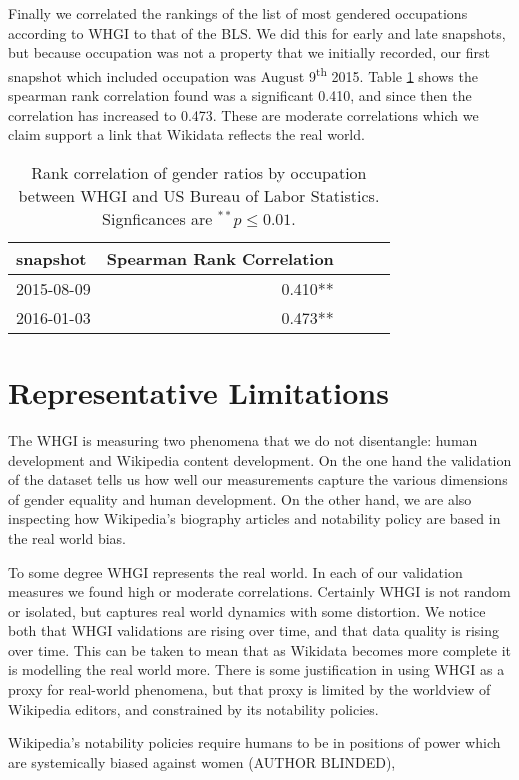 \documentclass{sig-alternate-05-2015}
\begin{document}
Finally we correlated the rankings of the list of most gendered occupations according to WHGI to that of the BLS. We did this for early and late snapshots, but because occupation was not a property that we initially recorded, our first snapshot which included occupation was August 9\textsuperscript{th} 2015. Table \ref{table:bls} shows the spearman rank correlation found was a significant 0.410, and since then the correlation has increased to 0.473. These are moderate correlations which we claim support a link that Wikidata reflects the real world.

\begin{table}
\caption{Rank correlation of gender ratios by occupation between WHGI and US
Bureau of Labor Statistics. Signficances are $ ^{**}p\leq 0.01$.}
\begin{tabular}{lrrrr}
\toprule
snapshot &  Spearman Rank Correlation \\
\midrule
2015-08-09 & 0.410**  \\
2016-01-03 & 0.473**  \\
\bottomrule
\end{tabular}
\label{table:bls}
\end{table}

\section{Representative Limitations}

The WHGI is measuring two phenomena that we do not disentangle: human development and Wikipedia content development. On the one hand the validation of the dataset tells us how well our measurements capture the various dimensions of gender equality and human development. On the other hand, we are also inspecting how Wikipedia's biography articles and notability policy are based in the real world bias.

To some degree WHGI represents the real world. In each of our validation measures we found high or moderate correlations. Certainly WHGI is not random or isolated, but captures real world dynamics with some distortion. We notice both that WHGI validations are rising over time, and that data quality is rising over time. This can be taken to mean that as Wikidata becomes more complete it is modelling the real world more. There is some justification in using WHGI as a proxy for real-world phenomena, but that proxy is limited by the worldview of Wikipedia editors, and constrained by its notability policies.

Wikipedia's notability policies require humans to be in positions of power which are systemically biased against women (AUTHOR BLINDED), %
\end{document}
